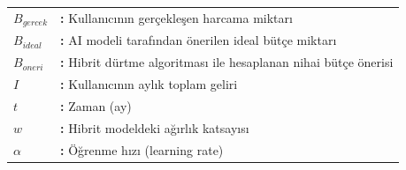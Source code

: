 \hspace{-3mm}
\begin{tabular}{p{2cm}l}
{\bf $B_{gercek}$} & {\bf:} Kullanıcının gerçekleşen harcama miktarı\\
{\bf $B_{ideal}$} & {\bf:} AI modeli tarafından önerilen ideal bütçe miktarı\\
{\bf $B_{oneri}$} & {\bf:} Hibrit dürtme algoritması ile hesaplanan nihai bütçe önerisi\\
{\bf $I$} & {\bf:} Kullanıcının aylık toplam geliri\\
{\bf $t$} & {\bf:} Zaman (ay)\\
{\bf $w$} & {\bf:} Hibrit modeldeki ağırlık katsayısı\\
{\bf $\alpha$} & {\bf:} Öğrenme hızı (learning rate)\\
\end{tabular}
